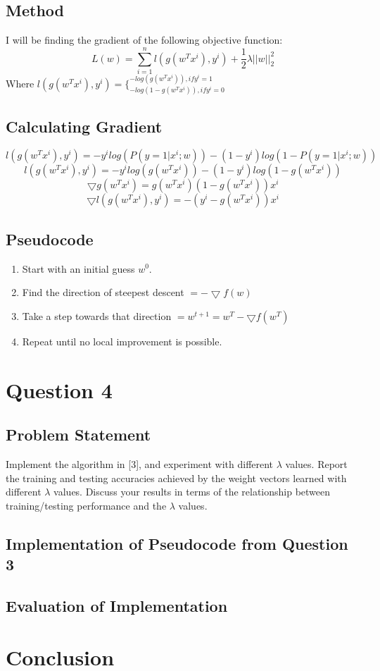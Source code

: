 \documentclass[letterpaper,10pt]{article}
\begin{document}
\subsection{Method}
I will be finding the gradient of the following objective function:
\[L(w) = \sum_{i=1}^n l(g(w^T x^i), y^i) + \frac{1}{2} \lambda ||w||_2^2  \]
Where \(l(g(w^T x^i), y^i) = \{^{-log(g(w^T x^i)), if y^i = 1}_{-log(1-g(w^T x^i)), if y^i = 0} \)

\subsection{Calculating Gradient}
\[ l(g(w^T x^i), y^i) = -y^i log(P(y=1 | x^i; w)) - (1-y^i) log(1-P(y=1 | x^i; w)) \]
\[ l(g(w^T x^i), y^i) = -y^i log(g(w^T x^i)) - (1-y^i) log(1 - g(w^T x^i)) \]
\[ \bigtriangledown g(w^T x^i) = g(w^T x^i) (1 - g(w^T x^i)) x^i \]
\[ \bigtriangledown l(g(w^T x^i), y^i) = -(y^i - g(w^T x^i)) x^i \]

\subsection{Pseudocode}
\begin{enumerate}
	\item{Start with an initial guess \(w^0\).}
	\item{Find the direction of steepest descent \(= - \bigtriangledown f(w) \)}
	\item{Take a step towards that direction \( = w^{t+1} = w^T - \bigtriangledown f(w^T) \)}
	\item{Repeat until no local improvement is possible.}
\end{enumerate}

\section{Question 4}
\subsection{Problem Statement}
Implement the algorithm in [3], and experiment with different \(\lambda\) values. Report the training and testing accuracies achieved by the weight vectors learned with different \(\lambda\) values. Discuss your results in terms of the relationship between training/testing performance and the \(\lambda\) values.

\subsection{Implementation of Pseudocode from Question 3}
\subsection{Evaluation of Implementation}

\section{Conclusion}
\end{document}
